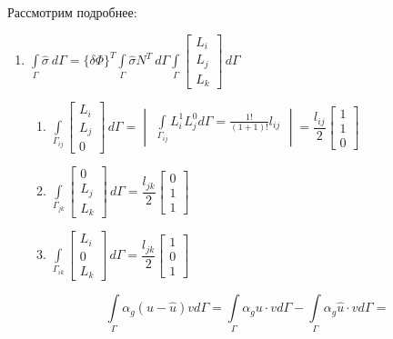 \documentclass{bmstu}
\begin{document}
	Рассмотрим подробнее:
	\begin{enumerate}
		\item $
		\displaystyle\int\limits_{\Gamma} \hat \sigma \ d\Gamma = \{\delta \Phi\}^T \int\limits_{\Gamma} \hat \sigma N^T\ d\Gamma\int\limits_{\Gamma} \begin{bmatrix}
			L_i \\ L_j \\ L_k
		\end{bmatrix} \, d\Gamma$
		\begin{enumerate}
			\item $\displaystyle\int\limits_{\Gamma_{ij}} \begin{bmatrix}
				L_i \\ L_j \\ 0
			\end{bmatrix} \, d\Gamma = 
			\begin{vmatrix}
			\displaystyle\int\limits_{\Gamma_{ij}} L_i^1 L_j^0 d\Gamma = \frac{1!}{(1+1)!} l_{ij}
			\end{vmatrix}= \dfrac{l_{ij}}{2}\begin{bmatrix}
			1\\1\\0
		\end{bmatrix}$
		\item $\displaystyle\int\limits_{\Gamma_{jk}} \begin{bmatrix}
				0 \\ L_j \\ L_k
			\end{bmatrix} \, d\Gamma = \dfrac{l_{jk}}{2}\begin{bmatrix}
			0\\1\\1
		\end{bmatrix}$
		\item $\displaystyle\int\limits_{\Gamma_{ik}} \begin{bmatrix}
				L_i \\ 0 \\ L_k
			\end{bmatrix} \, d\Gamma = \dfrac{l_{jk}}{2}\begin{bmatrix}
			1\\0\\1
		\end{bmatrix}$
		\end{enumerate}
	\[\int \limits_{\Gamma} \alpha_g (u - \hat u) v d \Gamma = \int \limits_{\Gamma} \alpha_g u \cdot v d \Gamma - \int \limits_{\Gamma} \alpha_g \hat u \cdot v d \Gamma = \]

\end{enumerate}
\end{document}
